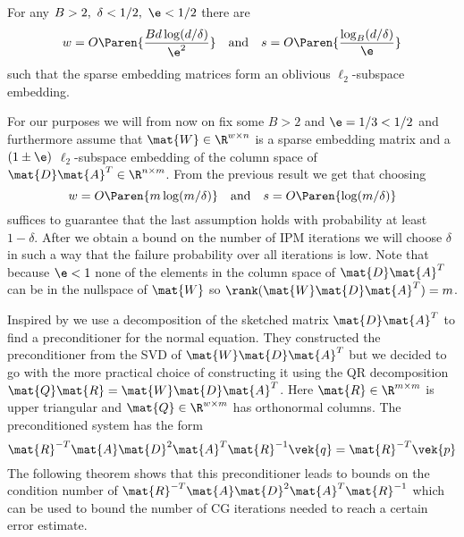 \begin{theorem}\label{thm:sparse-ose}
For any \(B > 2, \ \delta < 1/2, \ \e < 1/2\) there are
\[ w = O \Paren{\frac{B d \log(d/\delta)}{\e^2}} \quad \text{and} \quad s = O \Paren{\frac{\log_B(d/\delta)}{\e}}\]
such that the sparse embedding matrices form an oblivious \(\ell_2\)-subspace embedding.
\end{theorem}

For our purposes we will from now on fix some \(B > 2\) and \(\e = 1/3 < 1/2\) and furthermore assume that \(\mat{W} \in \R^{w \times n}\) is a sparse embedding matrix and a \((1\pm\e)\) \(\ell_2\)-subspace embedding of the column space of \(\mat{D}\mat{A}^T \in \R^{n \times m}\).
From the previous result we get that choosing
\begin{equation} \label{eqn:sparse-ose-params}
  w = O \Paren{m \log(m/\delta)} \quad \text{and} \quad s = O \Paren{\log(m/\delta)}
\end{equation}
suffices to guarantee that the last assumption holds with probability at least \(1 - \delta\).
After we obtain a bound on the number of IPM iterations we will choose \(\delta\) in such a way that the failure probability over all iterations is low.
Note that because \(\e < 1\) none of the elements in the column space of \(\mat{D}\mat{A}^T\) can be in the nullspace of \(\mat{W}\) so \(\rank(\mat{W}\mat{D}\mat{A}^T) = m\).

Inspired by \textcite{Avron-FasterRandomizedInfeasibleIPMs} we use a decomposition of the sketched matrix \(\mat{D}\mat{A}^T\) to find a preconditioner for the normal equation.
They constructed the preconditioner from the SVD of \(\mat{W}\mat{D}\mat{A}^T\) but we decided to go with the more practical choice of constructing it using the QR decomposition \(\mat{Q}\mat{R} = \mat{W}\mat{D}\mat{A}^T\).
Here \(\mat{R} \in \R^{m \times m}\) is upper triangular and \(\mat{Q} \in \R^{w \times m}\) has orthonormal columns.
The preconditioned system has the form
\begin{equation} \label{eqn:preconditioned-system2}
 \mat{R}^{-T} \mat{A} \mat{D}^2 \mat{A}^T \mat{R}^{-1} \vek{q} = \mat{R}^{-T} \vek{p}
\end{equation}
The following theorem shows that this preconditioner leads to bounds on the condition number of \(\mat{R}^{-T} \mat{A} \mat{D}^2 \mat{A}^T \mat{R}^{-1}\) which can be used to bound the number of CG iterations needed to reach a certain error estimate.

